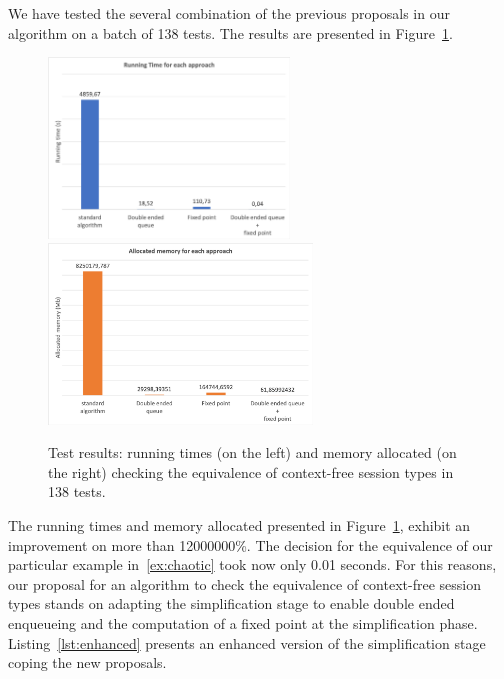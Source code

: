 We have tested the several combination of the previous proposals
in our algorithm on a batch of 138 tests. The results are presented 
in Figure~\ref{fig:results}.

\begin{figure}[h]
	\includegraphics[height=4.8cm]{img/run_time}	\qquad 
	\includegraphics[height=4.8cm]{img/memory_alloc}	
	\caption{Test results: running times (on the left) and
	memory allocated (on the right) checking the equivalence 
	of context-free session types in 138 tests.}
	\label{fig:results}
\end{figure}

The running times and memory allocated presented in 
Figure~\ref{fig:results}, exhibit an improvement on more 
than 12000000\%. The decision for the equivalence of our particular
example in~\eqref{ex:chaotic} took now only 0.01
seconds. For this reasons, our proposal for an
algorithm to check the equivalence of context-free session types 
stands on adapting the simplification stage to enable double ended 
enqueueing and the computation of a fixed point at the
simplification phase. Listing~\ref{lst:enhanced} presents
an enhanced version of the simplification stage coping the new
proposals.

